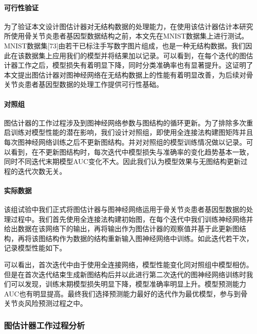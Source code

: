 \documentclass[
]{article}
\begin{document}
\hypertarget{ux53efux884cux6027ux9a8cux8bc1}{%
\paragraph{可行性验证}\label{ux53efux884cux6027ux9a8cux8bc1}}

为了验证本文设计图估计器对无结构数据的处理能力，在使用该估计器估计本研究所使用骨关节炎患者基因型数据结构之前，本文先在MNIST数据集上进行测试。MNIST数据集{[}73{]}由若干已标注手写数字图片组成，也是一种无结构数据。我们因此在该数据集上应用我们的模型并将结果加以记录。可以看到，在每个迭代的图估计器工作之后，模型损失有着明显下降，同时分类准确率也有显著提升。这证明了本文提出图估计器对图神经网络在无结构数据上的性能有着明显改善，为后续对骨关节炎患者基因型数据的处理工作提供可行性基础。

\hypertarget{ux5bf9ux7167ux7ec4}{%
\paragraph{对照组}\label{ux5bf9ux7167ux7ec4}}

图估计器的工作过程涉及到图神经网络参数与图结构的循环更新。为了排除多次重启训练对模型性能的潜在影响，我们设计对照组，即使用全连接法构建图矩阵并且每次图神经网络训练之后不更新图结构。并对对照组的模型训练情况做以记录。可以看到，在不更新图结构时，每次迭代中模型损失与准确率的变化趋势基本一致，同时不同迭代末期模型AUC变化不大。因此我们认为模型效果与无图结构更新过程的迭代次数无关。

\hypertarget{ux5b9eux9645ux6570ux636e}{%
\paragraph{实际数据}\label{ux5b9eux9645ux6570ux636e}}

该组试验中我们正式将图估计器与图神经网络运用于骨关节炎患者基因型数据的处理过程中。我们首先使用全连接法构建初始图，在每个迭代中我们训练神经网络并给出数据在该网络下的输出，再将输出作为图估计器的观察值并基于此更新图结构，再将该图结构作为数据的结构重新输入图神经网络中训练。如此迭代若干次，记录模型性能如下。

可以看出，首次迭代中由于使用全连接网络，模型性能变化同对照组中模型相仿。但是在首次迭代结束生成新图结构后并以此进行第二次迭代的图神经网络训练时我们可以发现，训练末期模型损失明显下降，模型准确率明显上升。模型预测能力AUC也有明显提高。最终我们选择预测能力最好的迭代作为最优模型，参与到骨关节炎风险预测过程之中。

\hypertarget{ux56feux4f30ux8ba1ux5668ux5de5ux4f5cux8fc7ux7a0bux5206ux6790}{%
\subsubsection{图估计器工作过程分析}\label{ux56feux4f30ux8ba1ux5668ux5de5ux4f5cux8fc7ux7a0bux5206ux6790}}
\end{document}
